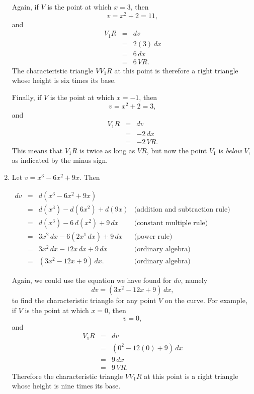 \documentclass[polutonikogreek,english,twoside,openright]{article}
\begin{document}
\begin{enumerate}
Again, if $V$ is the point at which $x=3$, then 
$$v= x^2 + 2 = 11,$$
and 
\begin{eqnarray*}
V_1R & = & dv\\
&= & 2(3)\,dx\\
& = & 6\,dx\\
& = & 6\,VR.
\end{eqnarray*}
The characteristic triangle $VV_1R$ at this point is therefore a right
triangle whose height is six times its base.

Finally, if $V$ is the point at which $x= -1$, then 
$$v = x^2 + 2 = 3,$$
and 
\begin{eqnarray*}
V_1R & = & dv\\
& = & -2\,dx\\
& = & -2\,VR.
\end{eqnarray*}
This means that $V_1R$ is twice as long as $VR$, but now the point
$V_1$ is {\em below} $V$, as indicated by the minus sign.

\item \label{ex2} Let $v =x^3 - 6x^2 +9x.$
Then
\begin{center}

$\begin{array}{ccll}
dv & = & d(x^3 - 6x^2 + 9x) & \\
& = & d(x^3) - d(6x^2) + d(9x) & \mbox{(addition and subtraction rule)} \\
& = & d(x^3) - 6\,d(x^2) + 9\,dx & \mbox{(constant multiple rule)} \\
& = & 3x^2\,dx - 6(2x^1\,dx) + 9\,dx & \mbox{(power rule)} \\
& = & 3x^2\,dx - 12x\,dx + 9\,dx & \mbox{(ordinary algebra)}\\
& = & (3x^2 -12x + 9)\,dx. & \mbox{(ordinary algebra)}
\end{array}$
\end{center}

Again, we could use the equation we have found for $dv$, namely
$$dv = (3x^2 -12x +9)\,dx,$$
to find the characteristic triangle for any point $V$ on the curve.
For example, if $V$ is the point at which $x= 0$, then
$$v = 0,$$
and 
\begin{eqnarray*}
V_1R & = & dv\\
& = & (0^2 - 12(0) +9)\,dx\\
& = & 9\,dx\\
& = & 9\,VR.
\end{eqnarray*}
Therefore the characteristic triangle $VV_1R$ at this point is a right
triangle whose height is nine times its base.


\end{enumerate}
\end{document}
